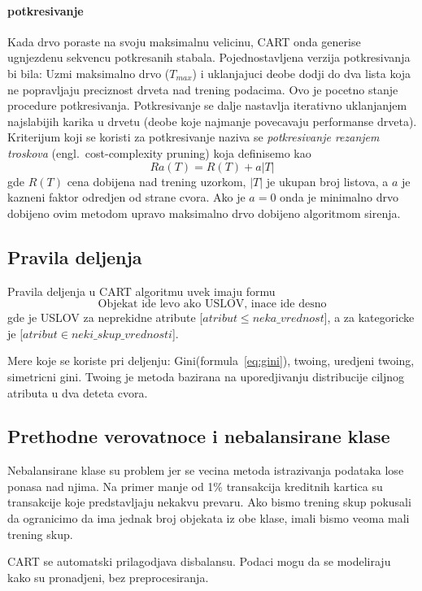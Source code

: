 \documentclass[a4paper]{article}
\begin{document}
\paragraph{potkresivanje} Kada drvo poraste na svoju maksimalnu velicinu, CART onda generise
ugnjezdenu sekvencu potkresanih stabala. Pojednostavljena verzija potkresivanja bi bila: Uzmi
maksimalno drvo (\(T_{max}\)) i uklanjajuci deobe dodji do dva lista koja ne popravljaju preciznost
drveta nad trening podacima. Ovo je pocetno stanje procedure potkresivanja. Potkresivanje se dalje
nastavlja iterativno uklanjanjem najslabijih karika u drvetu (deobe koje najmanje povecavaju
performanse drveta). Kriterijum koji se koristi za potkresivanje naziva se \emph{potkresivanje
rezanjem troskova} (engl.\ cost-complexity pruning) koja definisemo kao
\begin{equation}\label{eq:cost-complexity-pruning}
    Ra(T) = R(T) + a|T|
\end{equation}
gde \(R(T)\) cena dobijena nad trening uzorkom, \(|T|\) je ukupan broj listova, a \(a\) je kazneni
faktor odredjen od strane cvora. Ako je \(a = 0\) onda je minimalno drvo dobijeno ovim metodom
upravo maksimalno drvo dobijeno algoritmom sirenja.

\subsection{Pravila deljenja}
Pravila deljenja u CART algoritmu uvek imaju formu
\[
    \text{Objekat ide levo ako USLOV, inace ide desno}
\]
gde je USLOV za neprekidne atribute [\(atribut \leq neka\_vrednost\)], a za kategoricke je
[\(atribut \in neki\_skup\_vrednosti\)].

Mere koje se koriste pri deljenju: Gini(formula~\ref{eq:gini}), twoing, uredjeni twoing, simetricni
gini. Twoing je metoda bazirana na uporedjivanju distribucije ciljnog atributa u dva deteta cvora.

\subsection{Prethodne verovatnoce i nebalansirane klase}
Nebalansirane klase su problem jer se vecina metoda istrazivanja podataka lose ponasa nad njima. Na
primer manje od 1\% transakcija kreditnih kartica su transakcije koje predstavljaju nekakvu prevaru.
Ako bismo trening skup pokusali da ogranicimo da ima jednak broj objekata iz obe klase, imali bismo
veoma mali trening skup.

CART se automatski prilagodjava disbalansu. Podaci mogu da se modeliraju kako su pronadjeni, bez
preprocesiranja.
\end{document}
